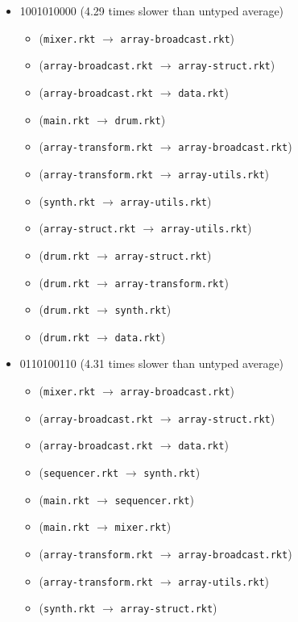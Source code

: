 \documentclass{article}
\newcommand{\mono}[1]{\texttt{#1}}
\begin{document}
\begin{itemize}
\item 1001010000 (4.29 times slower than untyped average)
  \begin{itemize}
  \item (\mono{mixer.rkt} $\rightarrow$ \mono{array-broadcast.rkt})
  \item (\mono{array-broadcast.rkt} $\rightarrow$ \mono{array-struct.rkt})
  \item (\mono{array-broadcast.rkt} $\rightarrow$ \mono{data.rkt})
  \item (\mono{main.rkt} $\rightarrow$ \mono{drum.rkt})
  \item (\mono{array-transform.rkt} $\rightarrow$ \mono{array-broadcast.rkt})
  \item (\mono{array-transform.rkt} $\rightarrow$ \mono{array-utils.rkt})
  \item (\mono{synth.rkt} $\rightarrow$ \mono{array-utils.rkt})
  \item (\mono{array-struct.rkt} $\rightarrow$ \mono{array-utils.rkt})
  \item (\mono{drum.rkt} $\rightarrow$ \mono{array-struct.rkt})
  \item (\mono{drum.rkt} $\rightarrow$ \mono{array-transform.rkt})
  \item (\mono{drum.rkt} $\rightarrow$ \mono{synth.rkt})
  \item (\mono{drum.rkt} $\rightarrow$ \mono{data.rkt})
  \end{itemize}
\item 0110100110 (4.31 times slower than untyped average)
  \begin{itemize}
  \item (\mono{mixer.rkt} $\rightarrow$ \mono{array-broadcast.rkt})
  \item (\mono{array-broadcast.rkt} $\rightarrow$ \mono{array-struct.rkt})
  \item (\mono{array-broadcast.rkt} $\rightarrow$ \mono{data.rkt})
  \item (\mono{sequencer.rkt} $\rightarrow$ \mono{synth.rkt})
  \item (\mono{main.rkt} $\rightarrow$ \mono{sequencer.rkt})
  \item (\mono{main.rkt} $\rightarrow$ \mono{mixer.rkt})
  \item (\mono{array-transform.rkt} $\rightarrow$ \mono{array-broadcast.rkt})
  \item (\mono{array-transform.rkt} $\rightarrow$ \mono{array-utils.rkt})
  \item (\mono{synth.rkt} $\rightarrow$ \mono{array-struct.rkt})

\end{itemize}
\end{itemize}
\end{document}
